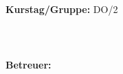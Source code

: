 \documentclass[12pt,a4paper]{article}
\begin{document}
\begin{verbatim}


\end{verbatim}
			\begin{flushleft}
			\textbf{\Large{Kurstag/Gruppe:}} \Large{DO/2}
			\end{flushleft}

\begin{verbatim}



\end{verbatim}
			\begin{flushleft}
			\LARGE{\textbf{Betreuer:}}	\Large{}	
			\end{flushleft}

\pagebreak
\end{document}
